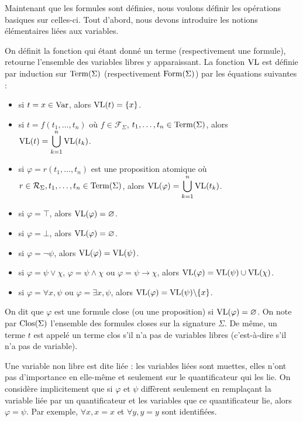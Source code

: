 Maintenant que les formules sont définies, nous voulons définir les opérations
basiques sur celles-ci. Tout d'abord, nous devons introduire les notions
élémentaires liées aux variables.

\begin{definition}
  On définit la fonction qui étant donné un terme (respectivement une formule),
  retourne l'ensemble des variables libres y apparaissant. La fonction $\operatorname{VL}$ est
  définie par induction sur $\operatorname{Term}(\Sigma)$ (respectivement $\operatorname{Form}(\Sigma)$)
  par les équations suivantes :
  \begin{itemize}
  \item si $t = x\in \operatorname{Var}$, alors $\operatorname{VL}(t) = \{x\}$.
  \item si $t = f(t_1,\ldots,t_n)$ où $f\in \mathcal F_\Sigma$,
    $t_1,\ldots,t_n\in\operatorname{Term}(\Sigma)$, alors
    $\displaystyle\operatorname{VL}(t) =\bigcup_{k = 1}^n \operatorname{VL}(t_k)$.
  \item si $\varphi = r(t_1,\ldots,t_n)$ est une proposition atomique où
    $r\in\mathcal R_\Sigma, t_1,\ldots,t_n\in\operatorname{Term}(\Sigma)$, alors
    $\displaystyle\operatorname{VL}(\varphi) = \bigcup_{k = 1}^n \operatorname{VL}(t_k)$.
  \item si $\varphi = \top$, alors $\operatorname{VL}(\varphi) = \varnothing$.
  \item si $\varphi = \bot$, alors $\operatorname{VL}(\varphi) = \varnothing$.
  \item si $\varphi = \lnot \psi$, alors $\operatorname{VL}(\varphi) = \operatorname{VL}(\psi)$.
  \item si $\varphi = \psi\lor\chi$, $\varphi = \psi\land \chi$ ou
    $\varphi = \psi\to\chi$, alors $\operatorname{VL}(\varphi) = \operatorname{VL}(\psi)\cup\operatorname{VL}(\chi)$.
  \item si $\varphi = \forall x, \psi$ ou $\varphi = \exists x, \psi$, alors
    $\operatorname{VL}(\varphi) = \operatorname{VL}(\psi)\backslash\{x\}$.
  \end{itemize}
  On dit que $\varphi$ est une formule close (ou une proposition) si
  $\operatorname{VL}(\varphi) =\varnothing$. On note par $\operatorname{Clos}(\Sigma)$ l'ensemble des
  formules closes sur la signature $\Sigma$. De même, un terme $t$ est appelé un
  terme clos s'il n'a pas de variables libres (c'est-à-dire s'il n'a pas de
  variable).
\end{definition}

\begin{remark}\label{rmk.alpha}
  Une variable non libre est dite liée : les variables liées sont muettes, elles
  n'ont pas d'importance en elle-même et seulement sur le quantificateur qui les
  lie. On considère implicitement que si $\varphi$ et $\psi$ diffèrent seulement
  en remplaçant la variable liée par un quantificateur et les variables que ce
  quantificateur lie, alors $\varphi = \psi$. Par exemple, $\forall x, x = x$ et
  $\forall y, y = y$ sont identifiées.
\end{remark}

